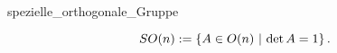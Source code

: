 \documentclass[class=article, crop=false]{standalone}
\begin{document}
\begin{zettel}{spezielle_orthogonale_Gruppe}
\begin{flashcard}[]{}
	\[
		SO (n):= \set{A \in  O (n)}{\det A =1}
	.\]
\end{flashcard}
\end{zettel}
\end{document}
